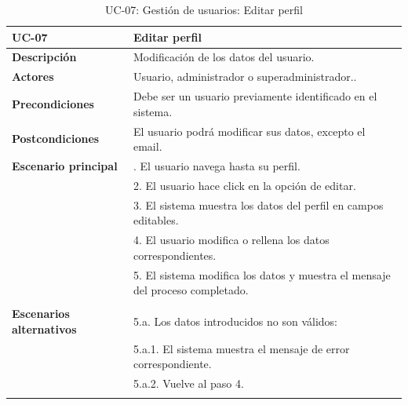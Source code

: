 \begin{table}
  \begin{center}
    \begin{tabularx}{16.4cm}{|l|X|}
      \hline
      \textbf{UC-07} & \textbf{Editar perfil}\\
      \hline
      \textbf{Descripción} & Modificación de los datos del usuario.\\
      \hline
      \textbf{Actores} & Usuario, administrador o superadministrador..\\
      \hline
      \textbf{Precondiciones} & Debe ser un usuario previamente identificado en el sistema.\\
      \hline
      \textbf{Postcondiciones} & El usuario podrá modificar sus datos, excepto el email.\\
      \hline
      \textbf{Escenario principal} & \smallskip 1. El usuario navega hasta su perfil.\\
      & 2. El usuario hace click en la opción de editar. \\
      & 3. El sistema muestra los datos del perfil en campos editables.\\
      & 4. El usuario modifica o rellena los datos correspondientes.\\
      & 5. El sistema modifica los datos y muestra el mensaje del proceso completado.\\ 
      & \\
      \hline
      \textbf{Escenarios alternativos} & \smallskip 5.a. Los datos introducidos no son válidos:\\
      & \hspace{0.3cm} 5.a.1. El sistema muestra el mensaje de error correspondiente.\\
      & \hspace{0.3cm} 5.a.2. Vuelve al paso 4.\\
      & \\
      \hline
    \end{tabularx}
    \caption{UC-07: Gestión de usuarios: Editar perfil}
    \label{tab:CU-editar-perfil}
  \end{center}
\end{table}


